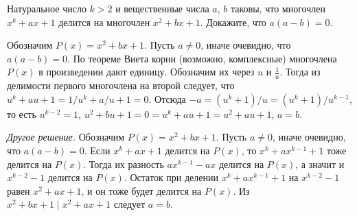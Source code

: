 Натуральное число $k > 2$ и вещественные числа $a$, $b$ таковы, что
многочлен $x^k + a x + 1$ делится на многочлен $x^2 + b x + 1$.
Докажите, что $a (a - b) = 0$.

\solution
Обозначим $P(x) = x^2 + b x + 1$.
Пусть $a \neq 0$, иначе очевидно, что $a (a - b) = 0$.
По теореме Виета корни (возможно, комплексные) многочлена $P(x)$ в произведении
дают единицу.
Обозначим их через $u$ и $\frac{1}{u}$.
Тогда из делимости первого многочлена на второй следует, что
$u^k + a u + 1 = 1 / u^k + a / u + 1 = 0$.
Отсюда
$-a = (u^k + 1) / u = (u^k + 1) / u^{k - 1}$,
то есть $u^{k - 2} = 1$,
$u^2 + b u + 1 = 0 = u^k + a u + 1 = u^2 + a u + 1$, $a = b$.
\par
\emph{Другое решение.}
Обозначим $P(x) = x^2 + b x + 1$.
Пусть $a \neq 0$, иначе очевидно, что $a (a - b) = 0$.
Если $x^k + a x + 1$ делится на $P(x)$, то $x^k + a x^{k - 1} + 1$ тоже делится
на $P(x)$.
Тогда их разность $a x^{k - 1} - a x$ делится на $P(x)$, а значит и
$x^{k - 2} - 1$ делится на $P(x)$.
Остаток при делении $x^k + a x^{k - 1} + 1$ на $x^{k - 2} - 1$ равен
$x^2 + a x + 1$, и он тоже будет делится на $P(x)$.
Из $x^2 + b x + 1 \mid x^2 + a x + 1$ следует $a = b$.

